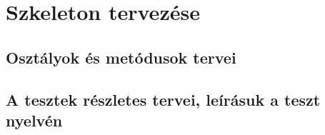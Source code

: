 

\usepackage{enumitem}



\fedlap

\addtocounter{section}{7}
\section{Szkeleton tervezése}
	\subsection{Osztályok és metódusok tervei}
	
	\subsection{A tesztek részletes tervei, leírásuk a teszt nyelvén}
			\newcommand{\testitem}[1]{\item \textbf{Név: #1}\\}
			\newcommand{\tdesc}[1]{\textbf{Leírás: } #1\\}
			\newcommand{\tcel}[1]{\textbf{Cél:} #1\\}
	
